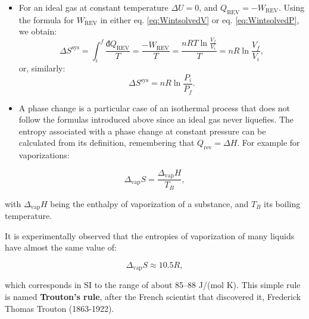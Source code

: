 \documentclass[
  9pt,
]{extbook}
\theoremstyle{definition}
\theoremstyle{definition}
\theoremstyle{definition}
\theoremstyle{remark}
\begin{document}
\begin{itemize}
\item
  For an ideal gas at constant temperature \(\Delta U =0\), and \(Q_{\mathrm{REV}} = -W_{\mathrm{REV}}\). Using the formula for \(W_{\mathrm{REV}}\) in either eq. \eqref{eq:WintsolvedV} or eq. \eqref{eq:WintsolvedP}, we obtain:
  \begin{equation}
  \Delta S^{\mathrm{sys}} = \int_i^f \frac{đQ_{\mathrm{REV}}}{T} = \frac{-W_{\mathrm{REV}}}{T} = \frac{nRT \ln \frac{V_f}{V_i}}{T} = nR \ln \frac{V_f}{V_i},
  \label{eq:sigconsttV}
  \end{equation}
  or, similarly:
  \begin{equation}
  \Delta S^{\mathrm{sys}} = nR \ln \frac{P_i}{P_f}.
  \label{eq:sigconsttP}
  \end{equation}
\item
  A phase change is a particular case of an isothermal process that does not follow the formulas introduced above since an ideal gas never liquefies. The entropy associated with a phase change at constant pressure can be calculated from its definition, remembering that \(Q_{\mathrm{rev}}= \Delta H\). For example for vaporizations:
\end{itemize}

\begin{equation}
\Delta_{\mathrm{vap}} S = \frac{\Delta_{\mathrm{vap}}H}{T_B},
\label{eq:spc}
\end{equation}

with \(\Delta_{\mathrm{vap}}H\) being the enthalpy of vaporization of a substance, and \(T_B\) its boiling temperature.

It is experimentally observed that the entropies of vaporization of many liquids have almost the same value of:

\begin{equation}
\Delta_{\mathrm{vap}} S \approx 10.5 R,
\label{eq:trouton}
\end{equation}

which corresponds in SI to the range of about 85--88 J/(mol K). This simple rule is named \textbf{Trouton's rule}, after the French scientist that discovered it, Frederick Thomas Trouton (1863-1922).
\end{document}
